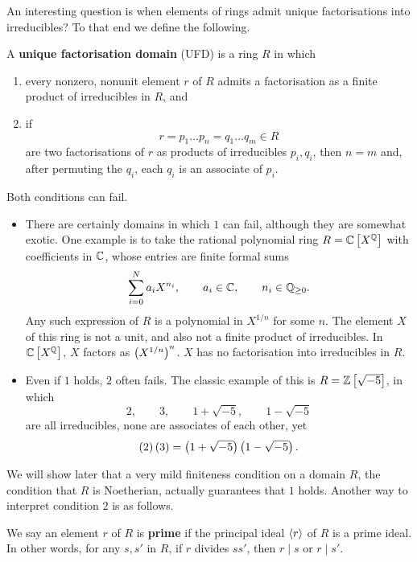 An interesting question is when elements of rings admit unique factorisations into irreducibles? To that end we define the following.

\begin{definition}
A \textbf{unique factorisation domain} (UFD) is a ring $ R $ in which
\begin{enumerate}
\item every nonzero, nonunit element $ r $ of $ R $ admits a factorisation as a finite product of irreducibles in $ R $, and
\item if
$$ r = p_1 \dots p_n = q_1 \dots q_m \in R $$
are two factorisations of $ r $ as products of irreducibles $ p_i, q_i $, then $ n = m $ and, after permuting the $ q_i $, each $ q_i $ is an associate of $ p_i $.
\end{enumerate}
\end{definition}

Both conditions can fail.

\begin{example*}
\hfill
\begin{itemize}
\item There are certainly domains in which $ 1 $ can fail, although they are somewhat exotic. One example is to take the rational polynomial ring $ R = \mathbb{C}\left[ X^{\mathbb{Q}} \right] $ with coefficients in $ \mathbb{C} $, whose entries are finite formal sums
$$ \sum_{i = 0}^N a_iX^{n_i}, \qquad a_i \in \mathbb{C}, \qquad n_i \in \mathbb{Q}_{\ge 0}. $$
Any such expression of $ R $ is a polynomial in $ X^{1 / n} $ for some $ n $. The element $ X $ of this ring is not a unit, and also not a finite product of irreducibles. In $ \mathbb{C}\left[ X^{\mathbb{Q}} \right] $, $ X $ factors as $ \left( X^{1 / n} \right)^n $. $ X $ has no factorisation into irreducibles in $ R $.
\item Even if $ 1 $ holds, $ 2 $ often fails. The classic example of this is $ R = \mathbb{Z}\left[ \sqrt{-5} \right] $, in which
$$ 2, \qquad 3, \qquad 1 + \sqrt{-5}, \qquad 1 - \sqrt{-5} $$
are all irreducibles, none are associates of each other, yet
$$ \left( 2 \right)\left( 3 \right) = \left( 1 + \sqrt{-5} \right)\left( 1 - \sqrt{-5} \right). $$
\end{itemize}
\end{example*}

We will show later that a very mild finiteness condition on a domain $ R $, the condition that $ R $ is Noetherian, actually guarantees that $ 1 $ holds. Another way to interpret condition $ 2 $ is as follows.

\begin{definition}
We say an element $ r $ of $ R $ is \textbf{prime} if the principal ideal $ \left\langle r \right\rangle $ of $ R $ is a prime ideal. In other words, for any $ s, s' $ in $ R $, if $ r $ divides $ ss' $, then $ r \mid s $ or $ r \mid s' $.
\end{definition}

